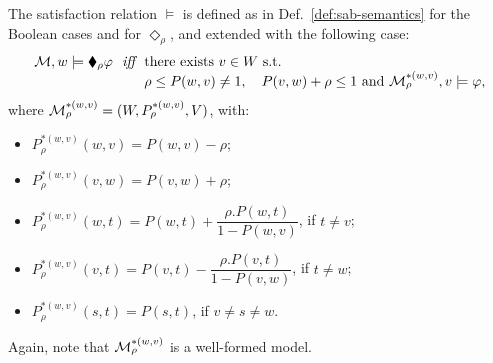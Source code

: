 \begin{definition}
    \label{def:swap-semantics}
    The satisfaction relation $\models$ is defined as in Def.~\ref{def:sab-semantics} for the Boolean cases and for $\Diamond_\rho$, and extended with the following case:
\[
    \begin{array}{l@{\ \ }c@{\ \ }l}
    \model,w\models \blacklozenge_\rho \varphi & \iff & \text{there exists }v\in W\text{ s.t. } \\
    && \rho \leq P(w,v)\neq 1,\quad P(v,w)+\rho\leq 1 \text{ and }\model^{*(w,v)}_\rho, v \models\varphi,
    \end{array}
\]
where $\mathcal{M}^{*(w,v)}_\rho = (W, P^{*(w,v)}_\rho,V)$, with:
\begin{itemize}
    \item $P^{*(w,v)}_\rho(w,v)=P(w,v)-\rho$;
    \item $P^{*(w,v)}_\rho(v,w)=P(v,w)+\rho$;
    \item $P^{*(w,v)}_\rho(w,t)=P(w,t)+
\dfrac{\rho.P(w,t)}{1-P(w,v)}$, if $ t \neq v$;
    \item $P^{*(w,v)}_\rho(v,t)=P(v,t)-
\dfrac{\rho.P(v,t)}{1-P(v,w)}$, if $ t \neq w$;
    \item $P^{*(w,v)}_\rho(s,t)=P(s,t)$, if $v\neq s\neq w$.
\end{itemize}

Again, note that $\mathcal{M}^{*(w,v)}_\rho$ is a well-formed model.
\end{definition}

